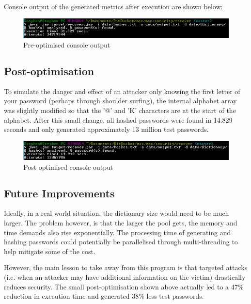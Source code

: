 \documentclass[journal,comsoc]{IEEEtran}
\begin{document}
	Console output of the generated metrics after execution are shown below:
	
	\begin{figure}[h!]
		\centering
		\includegraphics[width=0.9\linewidth]{images/recover_pre_optimised.png}
		\caption{Pre-optimised console output}
		\label{fig:preoptimisedconsoleoutput}
	\end{figure}	

	\subsection{Post-optimisation}
	
	To simulate the danger and effect of an attacker only knowing the first letter of your password (perhaps through shoulder surfing), the internal alphabet array was slightly modified so that the '@' and 'K' characters are at the start of the alphabet. After this small change, all hashed passwords were found in 14.829 seconds and only generated approximately 13 million test passwords.
	
	\begin{figure}[h!]
		\centering
		\includegraphics[width=0.9\linewidth]{images/recover_post_optimised.png}
		\caption{Post-optimised console output}
		\label{fig:postoptimisedconsoleoutput}
	\end{figure}
	
	\subsection{Future Improvements}
	
	Ideally, in a real world situation, the dictionary size would need to be much larger. The problem however, is that the larger the pool gets, the memory and time demands also rise exponentially. The processing time of generating and hashing passwords could potentially be parallelised through multi-threading to help mitigate some of the cost.
	
	However, the main lesson to take away from this program is that targeted attacks (i.e. when an attacker may have additional information on the victim) drastically reduces security. The small post-optimisation shown above actually led to a 47\% reduction in execution time and generated 38\% less test passwords.
	
\end{document}
